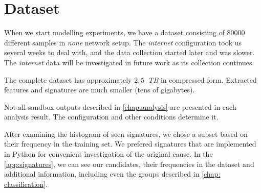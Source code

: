 \section{Dataset}
When we start modelling experiments, we have a dataset consisting of $80000$ different samples in \emph{none} network setup. The \emph{internet} configuration took us several weeks to deal with, and the data collection started later and was slower. The \emph{internet} data will be investigated in future work as its collection continues. 

The complete dataset has approximately $2,5$~\emph{TB} in compressed form. Extracted features and signatures are much smaller (tens of gigabytes). 

Not all sandbox outputs described in \ref{chap:analysis} are presented in each analysis result. The configuration and other conditions determine it.

After examining the histogram of seen signatures, we chose a subset based on their frequency in the training set. We prefered signatures that are implemented in Python for convenient investigation of the original cause. In the \ref{app:signatures}, we can see our candidates, their frequencies in the dataset and additional information, including even the groups described in \ref{chap: classification}.






